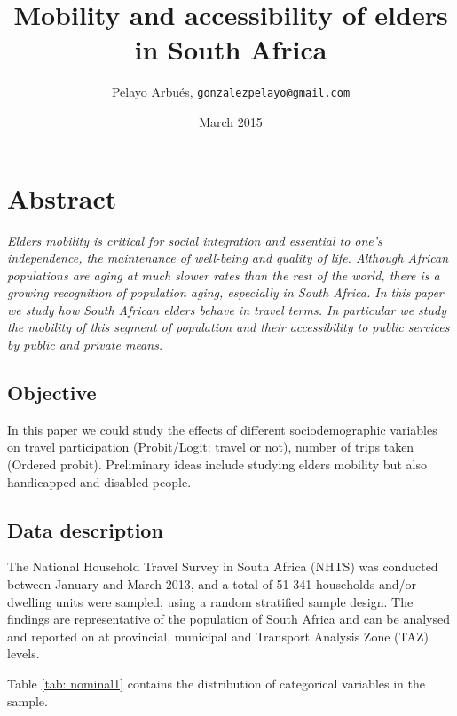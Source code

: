 \documentclass[]{article}
\title{Mobility and accessibility of elders in South Africa}
\author{Pelayo Arbués,
\href{mailto:gonzalezpelayo@gmail.com}{\nolinkurl{gonzalezpelayo@gmail.com}}}
\date{March 2015}
\begin{document}
\maketitle


\section{Abstract}\label{abstract}

\emph{Elders mobility is critical for social integration and essential
to one's independence, the maintenance of well-being and quality of
life. Although African populations are aging at much slower rates than
the rest of the world, there is a growing recognition of population
aging, especially in South Africa. In this paper we study how South
African elders behave in travel terms. In particular we study the
mobility of this segment of population and their accessibility to public
services by public and private means.}

\subsection{Objective}\label{objective}

In this paper we could study the effects of different sociodemographic
variables on travel participation (Probit/Logit: travel or not), number
of trips taken (Ordered probit). Preliminary ideas include studying
elders mobility but also handicapped and disabled people.

\subsection{Data description}\label{data-description}

The National Household Travel Survey in South Africa (NHTS) was
conducted between January and March 2013, and a total of 51 341
households and/or dwelling units were sampled, using a random stratified
sample design. The findings are representative of the population of
South Africa and can be analysed and reported on at provincial,
municipal and Transport Analysis Zone (TAZ) levels.

Table \ref{tab: nominal1} contains the distribution of categorical
variables in the sample.
\end{document}
